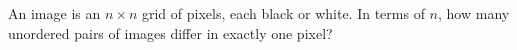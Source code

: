 An image is an $n\times n$ grid of pixels, each black or white. In terms of $n$, how many unordered pairs of images differ in exactly one pixel?
